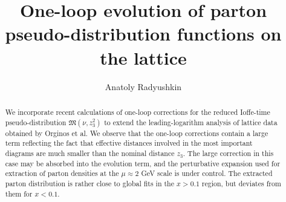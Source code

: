 \documentclass[aps,prd,twocolumn,showpacs,preprintnumbers,superscriptaddress]{revtex4-1}
\begin{document}




        

\title{One-loop evolution of parton pseudo-distribution functions on the   lattice} 


 \author{Anatoly Radyushkin }
 



         
                        
\begin{abstract}


  \noindent
  
  We  incorporate recent  calculations of   one-loop corrections 
  for the reduced Ioffe-time pseudo-distribution ${\mathfrak M} (\nu,z_3^2)$  to 
  extend    the leading-logarithm 
   analysis of lattice data obtained by Orginos et al.  
We   observe  that the one-loop   corrections contain a  large term
reflecting the fact that effective distances involved in  the  most important diagrams
    are much smaller than the nominal distance $z_3$. 
    The 
     large  correction in this  case may be 
    absorbed into the  evolution term, and 
    the perturbative expansion used for extraction of parton densities  
    at the $\mu \approx 2$ GeV scale 
      is  under control.
    The   extracted   parton distribution   is rather close to 
      global fits  in the $x>0.1$ region,  but deviates from them for  $x<0.1$.
   
   
 


              
\end{abstract}
      



\maketitle


\end{document}

